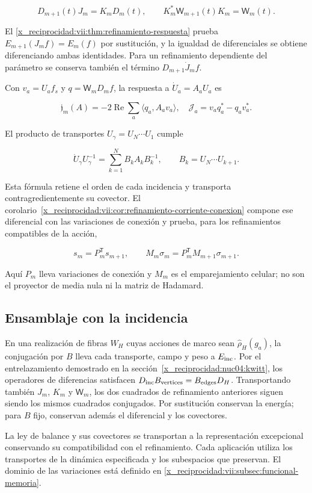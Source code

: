 \[
D_{m+1}(t)J_m=K_mD_m(t),\qquad
K_m^*\mathsf W_{m+1}(t)K_m=\mathsf W_m(t).
\]

El \cref{x_reciprocidad:vii:thm:refinamiento-respuesta} prueba \(E_{m+1}(J_mf)=E_m(f)\) por sustitución, y la igualdad de diferenciales se obtiene diferenciando ambas identidades. Para un refinamiento dependiente del parámetro se conserva también el término \(D_{m+1}\dot J_mf\).

Con \(v_a=U_af_s\) y \(q=\mathsf W_mD_mf\), la respuesta a \(\dot U_a=A_aU_a\) es

\[
\mathfrak j_m(A)=-2\operatorname{Re}\sum_a\langle q_a,A_av_a\rangle,
\quad \mathcal J_a=v_aq_a^*-q_av_a^*.
\]

El producto de transportes \(U_\gamma=U_N\cdots U_1\) cumple

\[
\dot U_\gamma U_\gamma^{-1}
=\sum_{k=1}^N B_kA_kB_k^{-1},\qquad B_k=U_N\cdots U_{k+1}.
\]

Esta fórmula retiene el orden de cada incidencia y transporta contragredientemente su covector. El corolario~\ref{x_reciprocidad:vii:cor:refinamiento-corriente-conexion} compone ese diferencial con las variaciones de conexión y prueba, para los refinamientos compatibles de la acción,

\[
s_m=P_m^{\mathsf T}s_{m+1},\qquad
M_m\sigma_m=P_m^{\mathsf T}M_{m+1}\sigma_{m+1}.
\]

Aquí \(P_m\) lleva variaciones de conexión y \(M_m\) es el emparejamiento celular; no son el proyector de media nula ni la matriz de Hadamard.

\subsection{Ensamblaje con la incidencia}

En una realización de fibras \(W_H\) cuyas acciones de marco sean \(\widehat\rho_H(g_a)\), la conjugación por \(B\) lleva cada transporte, campo y peso a \(E_{\rm inc}\). Por el entrelazamiento demostrado en la sección~\ref{x_reciprocidad:nuc04:kwitt}, los operadores de diferencias satisfacen \(D_{\rm inc}B_{\rm vertices}=B_{\rm edges}D_H\). Transportando también \(J_m\), \(K_m\) y \(\mathsf W_m\), los dos cuadrados de refinamiento anteriores siguen siendo los mismos cuadrados conjugados. Por sustitución conservan la energía; para \(B\) fijo, conservan además el diferencial y los covectores.

La ley de balance y sus covectores se transportan a la representación excepcional conservando su compatibilidad con el refinamiento. Cada aplicación utiliza los transportes de la dinámica especificada y los subespacios que preservan. El dominio de las variaciones está definido en \cref{x_reciprocidad:vii:subsec:funcional-memoria}.
